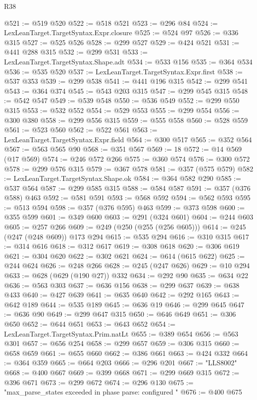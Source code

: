 \begin{lexlean}{R38}
\begin{coremodule}
@521 := @519 @520
@522 := @518 @521
@523 := @296 @84
@524 := LexLeanTarget.TargetSyntax.Expr.closure
@525 := @524 @97
@526 := @336 @315
@527 := @525 @526
@528 := @299 @527
@529 := @424 @521
@531 := @441 @288 @315
@532 := @299 @531
@533 := LexLeanTarget.TargetSyntax.Shape.adt
@534 := @533 @156
@535 := @364 @534
@536 := @535 @520
@537 := LexLeanTarget.TargetSyntax.Expr.first
@538 := @537 @353
@539 := @299 @538
@541 := @441 @196 @315
@542 := @299 @541
@543 := @364 @374
@545 := @543 @203 @315
@547 := @299 @545 @315
@548 := @542 @547
@549 := @539 @548
@550 := @536 @549
@552 := @299 @550 @315
@553 := @532 @552
@554 := @529 @553
@555 := @299 @554
@556 := @300 @380
@558 := @299 @556 @315
@559 := @555 @558
@560 := @528 @559
@561 := @523 @560
@562 := @522 @561
@563 := LexLeanTarget.TargetSyntax.Expr.field
@564 := @300 @517
@565 := @352 @564
@567 := @563 @565 @90
@568 := @351 @567
@569 := 18
@572 := @14 @569 (@17 @569)
@574 := @246 @572 @266
@575 := @360 @574
@576 := @300 @572
@578 := @299 @576 @315
@579 := @367 @578
@581 := @357 (@575 @579)
@582 := LexLeanTarget.TargetSyntax.Shape.ok
@584 := @364 @582 @290
@585 := @537 @564
@587 := @299 @585 @315
@588 := @584 @587
@591 := @357 (@376 @588) @463
@592 := @581 @591
@593 := @568 @592
@594 := @562 @593
@595 := @513 @594
@598 := @357 (@376 @595) @463
@599 := @373 @598
@600 := @355 @599
@601 := @349 @600
@603 := @291 (@324 @601)
@604 := @244 @603
@605 := @257 @266
@609 := @249 (@250 (@255 (@256 @605)))
@614 := @245 (@247 (@248 @609)) @173 @294
@615 := @535 @294
@616 := @310 @315
@617 := @314 @616
@618 := @312 @617
@619 := @308 @618
@620 := @306 @619
@621 := @304 @620
@622 := @302 @621
@624 := @614 (@615 @622)
@625 := @244 @624
@626 := @248 @266
@628 := @245 (@247 @626)
@629 := @10 @294
@633 := @628 (@629 (@190 @27)) @332
@634 := @292 @90
@635 := @634 @22
@636 := @563 @303
@637 := @636 @156
@638 := @299 @637
@639 := @638 @433
@640 := @427 @639
@641 := @635 @640
@642 := @292 @165
@643 := @642 @189
@644 := @535 @189
@645 := @636 @19
@646 := @299 @645
@647 := @636 @90
@649 := @299 @647 @315
@650 := @646 @649
@651 := @306 @650
@652 := @644 @651
@653 := @643 @652
@654 := LexLeanTarget.TargetSyntax.Prim.natLt
@655 := @389 @654
@656 := @563 @301
@657 := @656 @254
@658 := @299 @657
@659 := @306 @315
@660 := @658 @659
@661 := @655 @660
@662 := @386 @661
@663 := @424 @332
@664 := @364 @359
@665 := @664 @203
@666 := @296 @201
@667 := "LLS8002"
@668 := @400 @667
@669 := @399 @668
@671 := @299 @669 @315
@672 := @396 @671
@673 := @299 @672
@674 := @296 @130
@675 := "max_parse_states exceeded in phase parse: configured "
@676 := @400 @675

\end{coremodule}
\end{lexlean}
